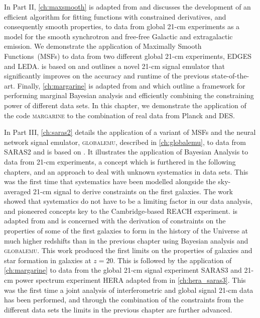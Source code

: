 \documentclass[a4paper,11pt,twoside,extrafontsizes,oldfontcommands]{memoir}
\begin{document}
In Part II, \cref{ch:maxsmooth} is adapted from \citep[Bevins et al. 2021a,][]{Bevins_maxsmooth_2021} and discusses the development of an efficient algorithm for fitting functions with constrained derivatives, and consequently smooth properties, to data from global 21-cm experiments as a model for the smooth synchrotron and free-free Galactic and extragalactic emission. We demonstrate the application of Maximally Smooth Functions~(MSFs) to data from two different global \mbox{21-cm} experiments, EDGES and LEDA.  is based on \citep[Bevins et al. 2021b,][]{Bevins_globalemu_2021} and outlines a novel 21-cm signal emulator that significantly improves on the accuracy and runtime of the previous state-of-the-art. Finally, \cref{ch:margarine} is adapted from \citep[Bevins et al. 2022b,][]{margarine_neurips} and \citep[Bevins et al. 2022c,][]{margarine_maxent} which outline a framework for performing marginal Bayesian analysis and efficiently combining the constraining power of different data sets. In this chapter, we demonstrate the application of the code \textsc{margarine} to the combination of real data from Planck and DES.

In Part III, \cref{ch:saras2} details the application of a variant of MSFs and the neural network signal emulator, \textsc{globalemu}, described in \cref{ch:globalemu}, to data from SARAS2 and is based on \citep[Bevins et al. 2022a,][]{Bevins_SARAS2_2022}. It illustrates the application of Bayesian Analysis to data from 21-cm experiments, a concept which is furthered in the following chapters, and an approach to deal with unknown systematics in data sets. This was the first time that systematics have been modelled alongside the sky-averaged 21-cm signal to derive constraints on the first galaxies. The work showed that systematics do not have to be a limiting factor in our data analysis, and pioneered concepts key to the Cambridge-based REACH experiment.  is adapted from \citep[Bevins et al. 2022d,][]{Bevins_saras3_2022} and is concerned with the derivation of constraints on the properties of some of the first galaxies to form in the history of the Universe at much higher redshifts than in the previous chapter using Bayesian analysis and \textsc{globalemu}. This work produced the first limits on the properties of galaxies and star formation in galaxies at $z=20$. This is followed by the application of \cref{ch:margarine} to data from the global 21-cm signal experiment SARAS3 and 21-cm power spectrum experiment HERA adapted from \citep[Bevins et al. 2023,][]{Bevins_hera_saras3_2023} in \cref{ch:hera_saras3}. This was the first time a joint analysis of interferometric and global signal 21-cm data has been performed, and through the combination of the constraints from the different data sets the limits in the previous chapter are further advanced.
\end{document}

